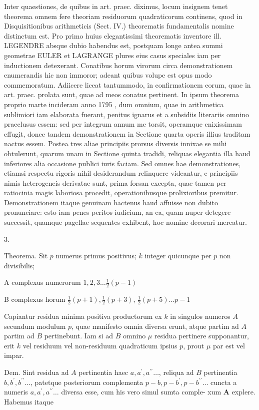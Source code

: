 \documentclass[10pt]{article}
\begin{document}
Inter quaestiones, de quibus in art. praec. diximus, locum insignem tenet theorema omnem fere theoriam residuorum quadraticorum continens, quod in Disquisitionibus arithmeticis (Sect. IV.) theorematis fundamentalis nomine distinctum
est. Pro primo huius elegantissimi theorematis inventore ill. LEGENDRE absque dubio habendus est, postquam longe antea summi geometrae EULER et LAGRANGE plures eius casus speciales iam per inductionem detexerant. Conatibus horum virorum circa demonstrationem enumerandis hic non immoror; adeant quibus volupe est opus modo commemoratum. Adiicere liceat tantummodo, in confirmationem eorum, quae in art. praec. prolata sunt, quae ad meos conatus pertinent. In ipsum theorema proprio marte incideram anno 1795 , dum omnium, quae in arithmetica sublimiori iam elaborata fuerant, penitus ignarus et a subsidiis literariis omnino praeclusus essem: sed per integrum annum me torsit, operamque enixissimam effugit, donec tandem demonstrationem in Sectione quarta operis illius traditam nactus essem. Postea tres aliae principiis prorsus diversis innixae se mihi obtulerunt, quarum unam in Sectione quinta tradidi, reliquas elegantia illa haud inferiores alia occasione publici iuris faciam. Sed omnes hae demonstrationes, etiamsi respectu rigoris nihil desiderandum relinquere videantur, e principiis nimis heterogeneis derivatae sunt, prima forsan excepta, quae tamen per ratiocinia magis laboriosa procedit, operationibusque prolixioribus premitur. Demonstrationem itaque genuinam hactenus haud affuisse non dubito pronunciare: esto iam penes peritos iudicium, an ea, quam nuper detegere successit, quamque pagellae sequentes exhibent, hoc nomine decorari mereatur.

3.

Theorema. Sit \(p\) numerus primus positivus; \(k\) integer quicunque per \(p\) non divisibilis;

A complexus numerorum \(1,2,3 \ldots \frac{1}{2}(p-1)\)

B complexus horum \(\frac{1}{2}(p+1), \frac{1}{2}(p+3)\), \(\frac{1}{2}(p+5) \ldots p-1\)

Capiantur residua minima positiva productorum ex \(k\) in singulos numeros \(A\) secundum modulum \(p\), quae manifesto omnia diversa erunt, atque partim ad \(A\) partim ad \(B\) pertinebunt. Iam si ad \(B\) omnino \(\mu\) residua pertinere supponantur, erit \(k\) vel residuum vel non-residuum quadraticum ipsius \(p\), prout \(\mu\) par est vel impar.

Dem. Sint residua ad \(A\) pertinentia haec \(a, a^{\prime}, a^{\prime \prime} \ldots\), reliqua ad \(B\) pertinentia \(b, b^{\prime}, b^{\prime \prime} \ldots\), patetque posteriorum complementa \(p-b, p-b^{\prime}, p-b^{\prime \prime} \ldots\) cuncta a numeris \(a, a^{\prime}, a^{\prime \prime} \ldots\) diversa esse, cum his vero simul sumta comple-
xum \(\boldsymbol{A}\) explere. Habemus itaque
\end{document}
